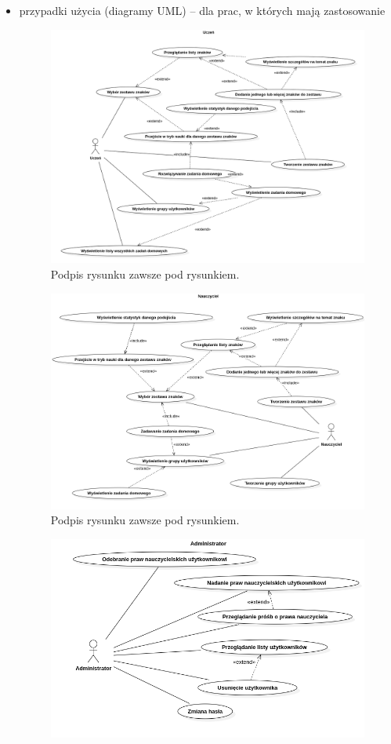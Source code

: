 \documentclass[a4paper,twoside,12pt]{book}
\begin{document}
\begin{itemize}
\item przypadki użycia (diagramy UML) -- dla prac, w których mają zastosowanie
\begin{figure}
\centering
\includegraphics[width=\textwidth]{Uczen}
\caption{Podpis rysunku zawsze pod rysunkiem.}
\label{fig:etykieta-rysunku}
\end{figure}
\begin{figure}
\centering
\includegraphics[width=\textwidth]{Nauczyciel}
\caption{Podpis rysunku zawsze pod rysunkiem.}
\label{fig:etykieta-rysunku}
\end{figure}
\begin{figure}
\centering
\includegraphics[width=\textwidth]{Admin}

\end{figure}
\end{itemize}
\end{document}
